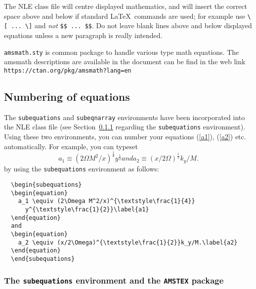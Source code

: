 \documentclass{nle}
\begin{document}
The NLE class file will centre displayed mathematics, and will insert the
correct space above and below if standard \LaTeX\ commands are used; for
example use \verb"\[ ... \]" and \emph{not} \verb"$$ ... $$". Do not leave
blank lines above and below displayed equations unless a new paragraph is
really intended.

\verb"amsmath.sty" is common package to handle various type math equations. The amsmath descriptions are available in the document can be find in the web link \verb"https://ctan.org/pkg/amsmath?lang=en"

\subsection{Numbering of equations}

The \verb"subequations" and \verb"subeqnarray" environments have been
incorporated into the NLE class file (see Section~\ref{sub:amstex} regarding
the \verb"subequations" environment). Using these two environments,
you can number your equations (\ref{a1}), (\ref{a2}) etc. automatically.
For example, you can typeset
  \begin{subequations}
  \begin{equation}
    a_1 \equiv (2\Omega M^2/x)^{\textstyle\frac{1}{4}}
      y^{\textstyle\frac{1}{2}}\label{a1}
  \end{equation}
  and
  \begin{equation}
    a_2 \equiv (x/2\Omega)^{\textstyle\frac{1}{2}}k_y/M.\label{a2}
  \end{equation}
  \end{subequations}
by using the \verb"subequations" environment as follows:
%
\begin{verbatim}
  \begin{subequations}
  \begin{equation}
    a_1 \equiv (2\Omega M^2/x)^{\textstyle\frac{1}{4}}
      y^{\textstyle\frac{1}{2}}\label{a1}
  \end{equation}
  and
  \begin{equation}
    a_2 \equiv (x/2\Omega)^{\textstyle\frac{1}{2}}k_y/M.\label{a2}
  \end{equation}
  \end{subequations}
\end{verbatim}

\subsubsection{The \texttt{subequations} environment and the
  \texttt{AMSTEX} package} \label{sub:amstex}
\end{document}
